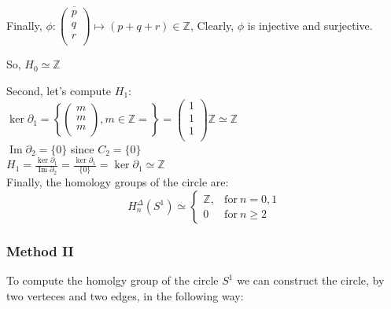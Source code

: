 \documentclass[11pt,a4paper]{report}
\DeclareMathOperator{\Ima}{Im}
\begin{document}
           Finally, $ \phi: \overline{\left(\begin{array}{c}
                    p\\
                    q\\
                    r\\
            \end{array} \right)} \mapsto (p+q+r) \in \mathbb{Z} $, Clearly, $\phi$ is injective and surjective. 
            
          So, $H_0 \simeq \mathbb{Z} $ \\

\par
Second, let's compute $H_1$: \\
$\ker\partial_1 = \left\{ \left(\begin{array}{c}
                    m\\
                    m\\
                    m\\
            \end{array} \right), m \in \mathbb{Z} = \right\} = \left(\begin{array}{c}
                    1\\
                    1\\
                    1\\
            \end{array} \right) \mathbb{Z} \simeq \mathbb{Z}$ \\ 
$\Ima\partial_2 = \{0\}$ since $C_2 = \{0\}$ \\
$H_1 = \frac{\ker\partial_1}{\Ima\partial_2} = 
		\frac{ \ker{\partial_1} }{ \{0\} } = \ker{\partial_1} \simeq \mathbb{Z}$ \\


Finally, the homology groups of the circle are: 
		\[
	  		H_n^\Delta(S^1) \simeq \left\{
			      \begin{array}{rl}
			     \mathbb{Z}, & \textrm{for} \: n = 0, 1\\
			    
                        0 & \textrm{for} \: n \geqslant 2
			      \end{array}
			 \right.
	  	\]

 \subsubsection{Method II}
                  To compute the homolgy group of the circle $S^1$ we can construct the circle, by two verteces and two edges, in the following way: \\
                
\end{document}
